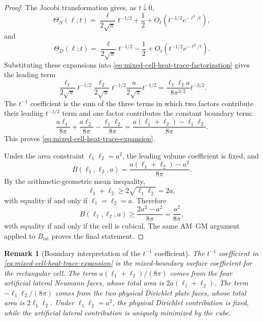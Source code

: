 \documentclass[11pt]{article}
\newtheorem{remark}[theorem]{Remark}
\begin{document}
\begin{proof}
The Jacobi transformation gives, as \(t\downarrow0\),
\begin{equation}
    \Theta_N(\ell;t)
    =
    \frac{\ell}{2\sqrt{\pi}}t^{-1/2}
    +
    \frac12
    +
    O_\ell(t^{-1/2}e^{-\ell^2/t}),
    \label{eq:theta-neumann-small-t}
\end{equation}
and
\begin{equation}
    \Theta_D(\ell;t)
    =
    \frac{\ell}{2\sqrt{\pi}}t^{-1/2}
    -
    \frac12
    +
    O_\ell(t^{-1/2}e^{-\ell^2/t}).
    \label{eq:theta-dirichlet-small-t}
\end{equation}
Substituting these expansions into
\eqref{eq:mixed-cell-heat-trace-factorization} gives the leading term
\[
    \frac{\ell_1}{2\sqrt{\pi}}t^{-1/2}
    \frac{\ell_2}{2\sqrt{\pi}}t^{-1/2}
    \frac{a}{2\sqrt{\pi}}t^{-1/2}
    =
    \frac{\ell_1\ell_2a}{8\pi^{3/2}}t^{-3/2}.
\]
The \(t^{-1}\) coefficient is the sum of the three terms in which two
factors contribute their leading \(t^{-1/2}\) term and one factor contributes
the constant boundary term:
\[
    \frac{a\ell_1}{8\pi}
    +
    \frac{a\ell_2}{8\pi}
    -
    \frac{\ell_1\ell_2}{8\pi}
    =
    \frac{a(\ell_1+\ell_2)-\ell_1\ell_2}{8\pi}.
\]
This proves \eqref{eq:mixed-cell-heat-trace-expansion}.

Under the area constraint \(\ell_1\ell_2=a^2\), the leading volume
coefficient is fixed, and
\[
    B(\ell_1,\ell_2,a)
    =
    \frac{a(\ell_1+\ell_2)-a^2}{8\pi}.
\]
By the arithmetic-geometric mean inequality,
\[
    \ell_1+\ell_2\geq 2\sqrt{\ell_1\ell_2}=2a,
\]
with equality if and only if \(\ell_1=\ell_2=a\).  Therefore
\[
    B(\ell_1,\ell_2,a)
    \geq
    \frac{2a^2-a^2}{8\pi}
    =
    \frac{a^2}{8\pi},
\]
with equality if and only if the cell is cubical.  The same AM--GM argument
applied to \(B_{\mathrm{lat}}\) proves the final statement.
\end{proof}

\begin{remark}[Boundary interpretation of the \(t^{-1}\) coefficient]
The \(t^{-1}\) coefficient in
\eqref{eq:mixed-cell-heat-trace-expansion} is the mixed-boundary surface
coefficient for the rectangular cell.  The term
\(a(\ell_1+\ell_2)/(8\pi)\) comes from the four artificial lateral Neumann
faces, whose total area is \(2a(\ell_1+\ell_2)\).  The term
\(-\ell_1\ell_2/(8\pi)\) comes from the two physical Dirichlet plate faces,
whose total area is \(2\ell_1\ell_2\).  Under
\(\ell_1\ell_2=a^2\), the physical Dirichlet contribution is fixed, while
the artificial lateral contribution is uniquely minimized by the cube.
\end{remark}
\end{document}
